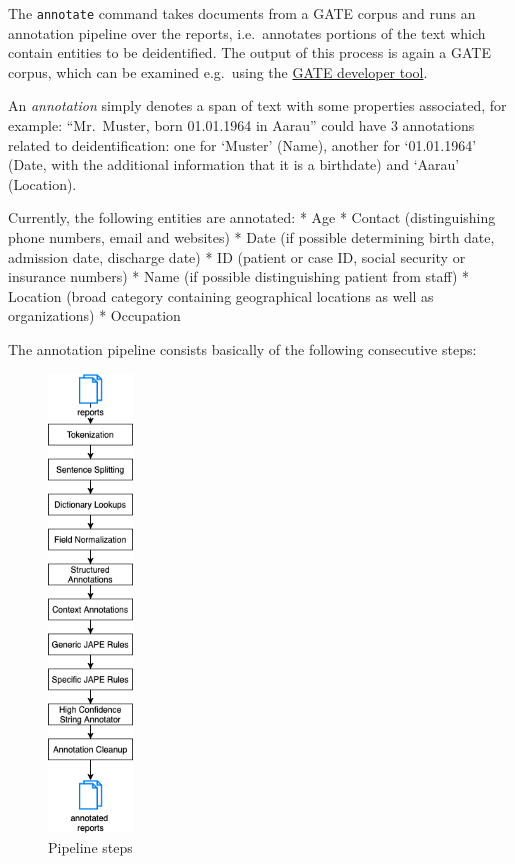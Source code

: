 The \texttt{annotate} command takes documents from a GATE corpus and
runs an annotation pipeline over the reports, i.e.~annotates portions of
the text which contain entities to be deidentified. The output of this
process is again a GATE corpus, which can be examined e.g.~using the
\href{https://gate.ac.uk/download/}{GATE developer tool}.

An \emph{annotation} simply denotes a span of text with some properties
associated, for example: ``Mr.~Muster, born 01.01.1964 in Aarau'' could
have 3 annotations related to deidentification: one for `Muster' (Name),
another for `01.01.1964' (Date, with the additional information that it
is a birthdate) and `Aarau' (Location).

Currently, the following entities are annotated: * Age * Contact
(distinguishing phone numbers, email and websites) * Date (if possible
determining birth date, admission date, discharge date) * ID (patient or
case ID, social security or insurance numbers) * Name (if possible
distinguishing patient from staff) * Location (broad category containing
geographical locations as well as organizations) * Occupation

The annotation pipeline consists basically of the following consecutive
steps:

\begin{figure}
\centering
\includegraphics[width=0.2\textwidth]{figs/pipeline_overview.png}
\caption{Pipeline steps}
\end{figure}


